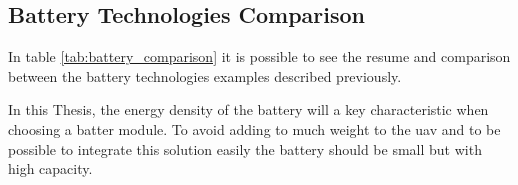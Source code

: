\subsection{Battery Technologies Comparison}
In table \ref{tab:battery_comparison} it is possible to see the resume and comparison between the battery technologies examples described previously.
\begin{table}[H]
    \centering
    \caption{Comparison of Battery Technologies}
    \label{tab:battery_comparison}
\end{table}

In this Thesis, the energy density of the battery will a key characteristic when choosing a batter module.
To avoid adding to much weight to the \gls{uav} and to be possible to integrate this solution easily the battery should be small but with high capacity.

